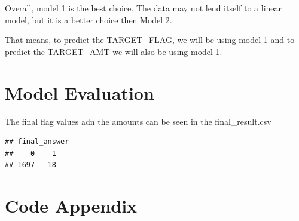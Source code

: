 \documentclass[]{article}
\begin{document}
Overall, model 1 is the best choice. The data may not lend itself to a
linear model, but it is a better choice then Model 2.

That means, to predict the TARGET\_FLAG, we will be using model 1 and to
predict the TARGET\_AMT we will also be using model 1.

\section{Model Evaluation}\label{model-evaluation}

The final flag values adn the amounts can be seen in the
final\_result.csv

\begin{verbatim}
## final_answer
##    0    1 
## 1697   18
\end{verbatim}

\section{Code Appendix}\label{code-appendix}
\end{document}
